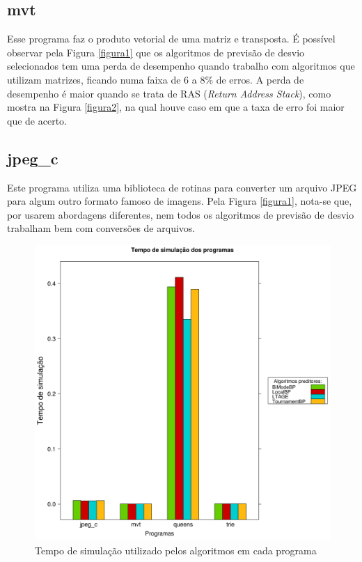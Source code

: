 \documentclass[12pt]{article}
\begin{document}
\subsection{mvt}

Esse programa faz o produto vetorial de uma matriz e transposta. É possível observar pela Figura \ref{figura1} que os algoritmos de previsão de desvio selecionados tem uma perda de desempenho quando trabalho com algoritmos que utilizam matrizes, ficando numa faixa de 6 a 8\% de erros. A perda de desempenho é maior quando se trata de RAS (\textit{Return Address Stack}), como mostra na Figura \ref{figura2}, na qual houve caso em que a taxa de erro foi maior que  de acerto. 

\subsection{jpeg\_c}

Este programa utiliza uma biblioteca de rotinas para converter um arquivo JPEG para algum outro formato famoso de imagens. Pela Figura \ref{figura1}, nota-se que, por usarem abordagens diferentes, nem todos os algoritmos de previsão de desvio trabalham bem com conversões de arquivos.

\begin{figure}[!htbp]
	
	\centering
	\includegraphics[scale=0.25]{Tempo_Execucao.png}
	\caption{Tempo de simulação utilizado pelos algoritmos em cada programa}
	\label{figura3}
	
\end{figure}
\end{document}
